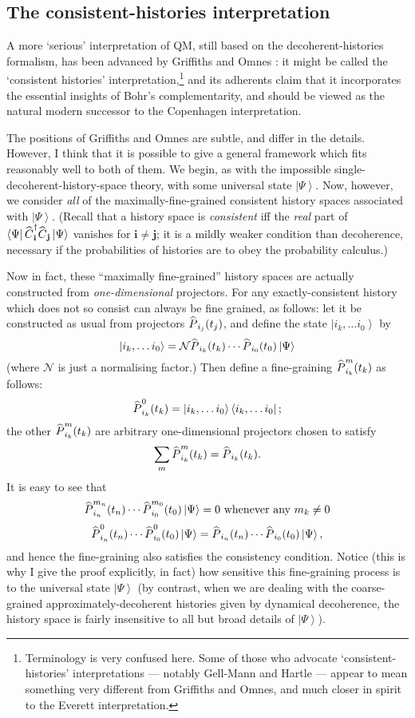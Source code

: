\documentclass[12pt]{article}
\newcommand{\be}{\begin{equation}}
\newcommand{\ee}{\end{equation}}
\newcommand{\vctr}[1]{\ensuremath{\mathbf{ #1 }}}
\newcommand{\mc}[1]{\ensuremath{\mathcal{#1}}}
\newcommand{\ket}[1]{\ensuremath{\left|  #1 \right\rangle}}
\newcommand{\bra}[1]{\ensuremath{\left\langle #1 \right|}}
\newcommand{\proj}[2]{\ensuremath{\ket{#1} \bra{#2}}}
\newcommand{\matel}[3]{\ensuremath{\bra{#1} #2 \ket{#3}}}
\newcommand{\op}[1]{\ensuremath{\widehat{\textsf{\ensuremath{#1}}}}}
\newcommand{\opad}[1]{\ensuremath{\op{#1}^{\dagger}}}
\begin{document}
\subsection{The consistent-histories interpretation}\label{DMWWhistoryinterpretation}

A more `serious' interpretation of QM, still based on the decoherent-histories formalism, has been advanced by Griffiths \citeyear{griffiths,griffithsbook} and  Omnes \citeyear{omnes,omnesbook}: it might be called the `consistent histories' interpretation,\footnote{Terminology is very confused here. Some of those who advocate `consistent-histories' interpretations --- notably Gell-Mann and Hartle  --- appear to mean something very different from Griffiths and Omnes, and much closer in spirit to the Everett interpretation.} and its adherents claim that it incorporates the essential insights of Bohr's complementarity, and should be viewed as the natural modern successor to the Copenhagen interpretation. 

The positions of Griffiths and Omnes are subtle, and differ in the details. However, I think that it is possible to give a general framework which fits reasonably well to both of them. We begin, as with the impossible single-decoherent-history-space theory, with some universal state \ket{\Psi}. Now, however, we consider \emph{all} of the maximally-fine-grained consistent history spaces associated with \ket{\Psi}. (Recall that a history space is \emph{consistent} iff the \emph{real} part of \matel{\Psi}{\opad{C}_\vctr{i}\op{C}_\vctr{j}}{\Psi} vanishes for $\vctr{i}\neq \vctr{j}$; it is a mildly weaker condition than decoherence, necessary if the probabilities of histories are to obey the probability calculus.) 

Now in fact, these ``maximally fine-grained'' history spaces are actually constructed from \emph{one-dimensional} projectors. For any exactly-consistent history which does not so consist can always be fine grained, as follows: let it be constructed as usual from projectors $\op{P}_{i_j}(t_j)$, and define the state \ket{i_k, \ldots i_0} by
\be
\ket{i_k, \ldots i_0}= \mc{N}\op{P}_{i_k}(t_k)\cdots \op{P}_{i_0}(t_0)\ket{\Psi}
\ee
(where \mc{N} is just a normalising factor.) Then define a fine-graining $\op{P}^m_{i_k}(t_k)$ as follows: 
\be \op{P}^0_{i_k}(t_k)=\proj{i_k, \ldots i_0}{i_k, \ldots i_0};\ee
the other $\op{P}^m_{i_k}(t_k)$ are arbitrary one-dimensional projectors chosen to satisfy
\be
\sum_m \op{P}^m_{i_k}(t_k)=\op{P}_{i_k}(t_k).
\ee
It is easy to see that
\[
\op{P}^{m_n}_{i_n}(t_n)\cdots \op{P}^{m_0}_{i_0}(t_0)\ket{\Psi}=0\mathrm {\mbox{      whenever any }}m_k \neq 0
\]
\be
\op{P}^{0}_{i_n}(t_n)\cdots \op{P}^{0}_{i_0}(t_0)\ket{\Psi}=\op{P}_{i_n}(t_n)\cdots \op{P}_{i_0}(t_0)\ket{\Psi},
\ee
and hence the fine-graining also satisfies the consistency condition. Notice (this is why I give the proof explicitly, in fact) how sensitive this fine-graining process is to the universal state \ket{\Psi} (by contrast, when we are dealing with the coarse-grained approximately-decoherent histories given by dynamical decoherence, the history space is fairly insensitive to all but broad details of \ket{\Psi}).
\end{document}
